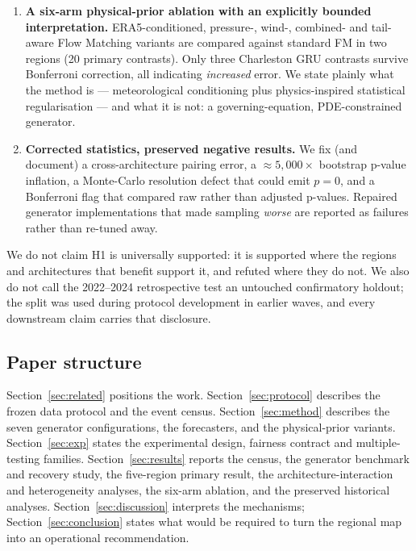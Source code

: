 \begin{enumerate}
    Cochran--Q test rejects effect homogeneity across regions for every
    augmentation arm ($p \le 1.4\times10^{-10}$), pairwise Holm tests
    localise the differences, and per-event severity analysis shows effects
    attenuating at high severity: benefits concentrate in low-to-moderate
    events, and harmful regions are most harmful there too
    (Section~\ref{sec:results-heterogeneity}).
    \item \textbf{A six-arm physical-prior ablation with an explicitly bounded
    interpretation.} ERA5-conditioned, pressure-, wind-, combined- and
    tail-aware Flow Matching variants are compared against standard FM in two
    regions (20 primary contrasts). Only three Charleston GRU contrasts
    survive Bonferroni correction, all indicating \emph{increased} error. We
    state plainly what the method is --- meteorological conditioning plus
    physics-inspired statistical regularisation --- and what it is not: a
    governing-equation, PDE-constrained generator.
    \item \textbf{Corrected statistics, preserved negative results.} We fix
    (and document) a cross-architecture pairing error, a $\approx5{,}000\times$
    bootstrap p-value inflation, a Monte-Carlo resolution defect that could
    emit $p=0$, and a Bonferroni flag that compared raw rather than adjusted
    p-values. Repaired generator implementations that made sampling
    \emph{worse} are reported as failures rather than re-tuned away.
\end{enumerate}

We do not claim H1 is universally supported: it is supported where the
regions and architectures that benefit support it, and refuted where they do
not. We also do not call the 2022--2024 retrospective test an untouched
confirmatory holdout; the split was used during protocol development in
earlier waves, and every downstream claim carries that disclosure.

\subsection{Paper structure}

Section~\ref{sec:related} positions the work. Section~\ref{sec:protocol}
describes the frozen data protocol and the event census. Section~\ref{sec:method}
describes the seven generator configurations, the forecasters, and the physical-prior
variants. Section~\ref{sec:exp} states the experimental design, fairness
contract and multiple-testing families. Section~\ref{sec:results} reports the
census, the generator benchmark and recovery study, the five-region primary
result, the architecture-interaction and heterogeneity analyses, the six-arm
ablation, and the preserved historical analyses. Section~\ref{sec:discussion}
interprets the mechanisms; Section~\ref{sec:conclusion} states what would be
required to turn the regional map into an operational recommendation.
